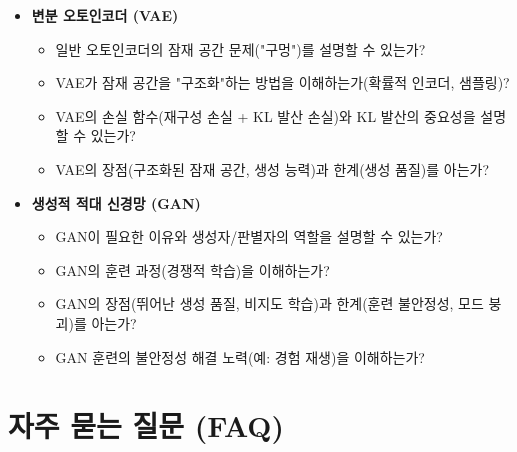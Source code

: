 \documentclass[11pt,a4paper]{article}
\theoremstyle{definition}
\begin{document}
\begin{tcolorbox}[summarybox, title=학습 점검 체크리스트]
\begin{itemize}
\begin{itemize}
        \item "방출 점수(Emission Scores)"의 의미와 역할은 무엇인가?
        \item Bi-LSTM-CRF의 장점(자동 특징 학습)과 단점(높은 계산 비용)을 아는가?
    \end{itemize}
    \item \textbf{변분 오토인코더 (VAE)}
    \begin{itemize}
        \item 일반 오토인코더의 잠재 공간 문제("구멍")를 설명할 수 있는가?
        \item VAE가 잠재 공간을 "구조화"하는 방법을 이해하는가(확률적 인코더, 샘플링)?
        \item VAE의 손실 함수(재구성 손실 + KL 발산 손실)와 KL 발산의 중요성을 설명할 수 있는가?
        \item VAE의 장점(구조화된 잠재 공간, 생성 능력)과 한계(생성 품질)를 아는가?
    \end{itemize}
    \item \textbf{생성적 적대 신경망 (GAN)}
    \begin{itemize}
        \item GAN이 필요한 이유와 생성자/판별자의 역할을 설명할 수 있는가?
        \item GAN의 훈련 과정(경쟁적 학습)을 이해하는가?
        \item GAN의 장점(뛰어난 생성 품질, 비지도 학습)과 한계(훈련 불안정성, 모드 붕괴)를 아는가?
        \item GAN 훈련의 불안정성 해결 노력(예: 경험 재생)을 이해하는가?
    \end{itemize}
\end{itemize}
\end{tcolorbox}

\newpage
\section{자주 묻는 질문 (FAQ)}
\end{document}
